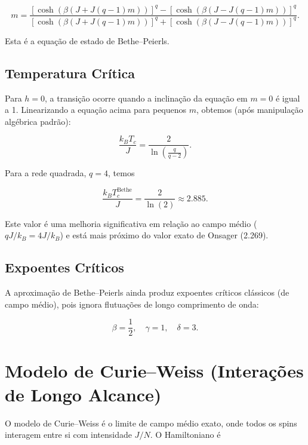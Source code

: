 \documentclass[12pt]{article}
\begin{document}
\begin{equation}
    m = \frac{ \left[ \cosh\left( \beta (J + J(q-1)m) \right) \right]^q - \left[ \cosh\left( \beta (J - J(q-1)m) \right) \right]^q }
             { \left[ \cosh\left( \beta (J + J(q-1)m) \right) \right]^q + \left[ \cosh\left( \beta (J - J(q-1)m) \right) \right]^q }.
\end{equation}

Esta é a equação de estado de Bethe–Peierls.

\subsection{Temperatura Crítica}

Para \(h=0\), a transição ocorre quando a inclinação da equação em \(m=0\) é igual a 1. Linearizando a equação acima para pequenos \(m\), obtemos (após manipulação algébrica padrão):

\begin{equation}
    \frac{k_B T_c}{J} = \frac{2}{\ln\left( \frac{q}{q-2} \right)}.
\end{equation}

Para a rede quadrada, \(q=4\), temos

\begin{equation}
    \frac{k_B T_c^{\text{Bethe}}}{J} = \frac{2}{\ln(2)} \approx 2.885.
\end{equation}

Este valor é uma melhoria significativa em relação ao campo médio (\(qJ/k_B = 4J/k_B\)) e está mais próximo do valor exato de Onsager (2.269).

\subsection{Expoentes Críticos}

A aproximação de Bethe–Peierls ainda produz expoentes críticos clássicos (de campo médio), pois ignora flutuações de longo comprimento de onda:

\begin{equation}
    \beta = \frac{1}{2}, \quad \gamma = 1, \quad \delta = 3.
\end{equation}

\section{Modelo de Curie–Weiss (Interações de Longo Alcance)}

O modelo de Curie–Weiss é o limite de campo médio exato, onde todos os spins interagem entre si com intensidade \(J/N\). O Hamiltoniano é
\end{document}
